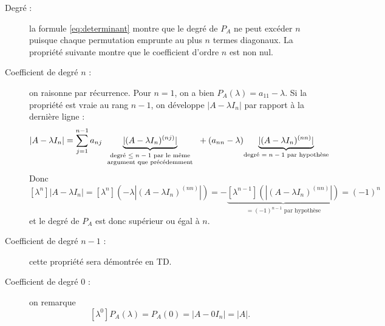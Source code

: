 \proof
\begin{description}
  \item[Degré :] la formule \eqref{eq:determinant} montre que le degré de $P_A$ ne peut excéder $n$ puisque chaque permutation emprunte au plus $n$ termes diagonaux. La propriété suivante montre que le coefficient d'ordre $n$ est non nul.
  \item[Coefficient de degré $n$ :] on raisonne par récurrence. Pour $n = 1$, on a bien $P_A(\lambda) = a_{11} - \lambda$. Si la propriété est vraie au rang $n-1$, on développe $|A - \lambda I_n|$ par rapport à la dernière ligne : 
  $$
  |A - \lambda I_n| 
  = \sum_{j=1}^{n-1} a_{nj} \underset{\scriptsize
    \begin{tabular}{c}\text{degré $\leq n-1$ par le même} \\
    \text{argument que précédemment}\end{tabular}
    }{\underbrace{|(A - \lambda I_n)^{(nj)}|}} + (a_{nn} - \lambda) \underset{\text{degré $= n-1$ par hypothèse}}{\underbrace{|(A - \lambda I_n)^{(nn)}|}}
  $$
  Donc
  $$
  [\lambda^n]|A - \lambda I_n| 
  = [\lambda^n](-\lambda |(A - \lambda I_n)^{(nn)}|) 
  = - \underset{\text{$= (-1)^{n-1}$ par hypothèse}}{\underbrace{[\lambda^{n-1}](|(A - \lambda I_n)^{(nn)}|)}}
  = (-1)^n
  $$
  et le degré de $P_A$ est donc supérieur ou égal à $n$.
  \item[Coefficient de degré $n-1$ :] cette propriété sera démontrée en TD.
  \item[Coefficient de degré $0$ :] on remarque
    $$
    [\lambda^0]P_A(\lambda) = P_A(0) = |A - 0 I_n| = |A|.
    $$
\end{description}
